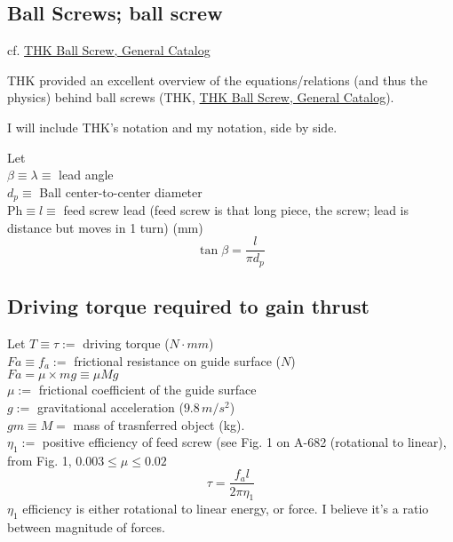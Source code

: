 \documentclass[10pt]{amsart}
\begin{document}
\begin{multicols*}{2}
\section{Ball Screws; ball screw} 

cf. \href{https://www.thk.com/sites/default/files/documents/uk_pdf/product/general/a/ee_A15.pdf}{THK Ball Screw, General Catalog}

THK provided an excellent overview of the equations/relations (and thus the physics) behind ball screws (THK, \href{https://www.thk.com/sites/default/files/documents/uk_pdf/product/general/a/ee_A15.pdf}{THK Ball Screw, General Catalog}).  

I will include THK's notation and my notation, side by side.  

Let \\
$\beta \equiv \lambda \equiv$ lead angle  \\
$d_p \equiv $ Ball center-to-center diameter \\
$\text{Ph} \equiv l \equiv $ feed screw lead (feed screw is that long piece, the screw; lead is distance but moves in 1 turn) (mm) \\
\begin{equation}
	\tan{\beta} = \frac{l}{\pi d_p} 
\end{equation}

\subsection{Driving torque required to gain thrust} 

Let 
$T \equiv \tau := $ driving torque ($N \cdot mm$) \\
$Fa \equiv f_a := $ frictional resistance on guide surface ($N$) \\
$Fa= \mu \times mg \equiv \mu Mg$ \\
$\mu := $ frictional coefficient of the guide surface  \\
$g := $ gravitational acceleration ($9.8 \, m/s^2$)  \\
$gm \equiv M =$ mass of trasnferred object (kg).  \\
$\eta_1 :=$ positive efficiency of feed screw (see Fig. 1 on A-682 (rotational to linear), from Fig. 1, $0.003 \leq \mu \leq 0.02$ 
\begin{equation}
\tau =  \frac{ f_a l }{ 2\pi \eta_1 }
\end{equation}
$\eta_1$ efficiency is either rotational to linear energy, or force.  I believe it's a ratio between magnitude of forces.  



\end{multicols*}
\end{document}
